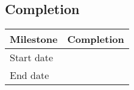 \documentclass[qipps.tex]{subfiles}
\begin{document}
\subsection{Completion}
\ifdraft{
}{}
\begin{tabu} to 170mm {|X[1,l]|X[5,c]|} \hline
Milestone   & Completion \\ \hline
Start date  &  \\ \hline
End date    &  \\ \hline
\end{tabu}

\end{document}
